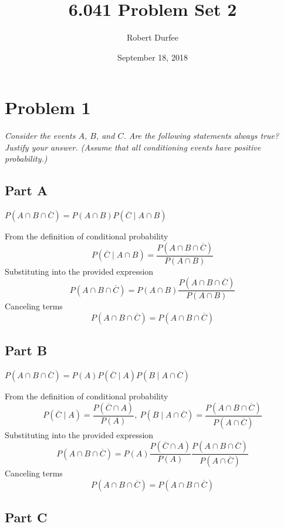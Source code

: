 \documentclass{article}
\title{6.041 Problem Set 2}
\author{Robert Durfee}
\date{September 18, 2018}
\begin{document}
\maketitle

\section*{Problem 1}

\textit{Consider the events $ A $, $ B $, and $ C $. Are the following
statements always true? Justify your answer. (Assume that all conditioning
events have positive probability.)}

\subsection*{Part A}

\textit{$ P \left( A \cap B \cap \overline{C} \right) = P \left( A \cap B
\right) P \left( \overline{C} \mid A \cap B \right) $}

\bigbreak

From the definition of conditional probability
$$ P ( \overline{C} \mid A \cap B ) = \frac{ P ( A \cap B \cap \overline{C} ) }{
    P ( A \cap B ) } $$
Substituting into the provided expression
$$ P ( A \cap B \cap \overline{C} ) = P ( A \cap B ) \frac{ P ( A \cap B \cap
\overline{C} ) }{ P ( A \cap B ) } $$
Canceling terms
$$ P ( A \cap B \cap \overline{C} ) =  P ( A \cap B \cap \overline{C} ) $$

\subsection*{Part B}

\textit{$ P \left( A \cap B \cap \overline{C} \right) = P \left( A \right) P
\left( \overline{C} \mid A \right) P \left( B \mid A \cap \overline{C} \right)
$}

\bigbreak

From the definition of conditional probability
$$ P ( \overline{C} \mid A ) = \frac{ P ( \overline{C} \cap A ) }{ P ( A ) },\ P
( B \mid A \cap \overline{C} ) = \frac{ P ( A \cap B \cap \overline{C} ) }{ P (
A \cap \overline{C} ) } $$
Substituting into the provided expression
$$ P ( A \cap B \cap \overline{C} ) = P ( A ) \frac{ P ( \overline{C} \cap A )
}{ P ( A ) } \frac{ P ( A \cap B \cap \overline{C} ) }{ P ( A \cap \overline{C}
) } $$
Canceling terms
$$ P ( A \cap B \cap \overline{C} ) =  P ( A \cap B \cap \overline{C} ) $$

\subsection*{Part C}
\end{document}
